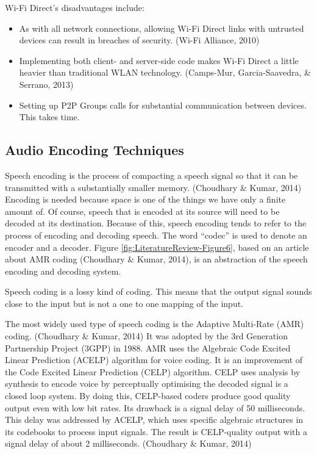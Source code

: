 \documentclass[12pt,svgnames,smaller]{article} %
\begin{document}
\begin{enumerate}
		Wi-Fi Direct’s disadvantages include:
		
		\begin{itemize}
			\item As with all network connections, allowing Wi-Fi Direct links with untrusted devices can result in breaches of security. (Wi-Fi Alliance, 2010)
			\item Implementing both client- and server-side code makes Wi-Fi Direct a little heavier than traditional WLAN technology. (Camps-Mur, Garcia-Saavedra, \& Serrano, 2013)
			\item Setting up P2P Groups calls for substantial communication between devices. This takes time. 
		\end{itemize}
		
		
	\end{enumerate} %
	
	
	\subsection{Audio Encoding Techniques}
	
	Speech encoding is the process of compacting a speech signal so that it can be transmitted with a substantially smaller memory. (Choudhary \& Kumar, 2014) Encoding is needed because space is one of the things we have only a finite amount of. Of course, speech that is encoded at its source will need to be decoded at its destination. Because of this, speech encoding tends to refer to the process of encoding and decoding speech. The word “codec” is used to denote an encoder and a decoder. Figure \ref{fig:LiteratureReview-Figure6}, based on an article about AMR coding (Choudhary \& Kumar, 2014), is an abstraction of the speech encoding and decoding system.
	
	Speech coding is a lossy kind of coding. This means that the output signal sounds close to the input but is not a one to one mapping of the input. 
	
	The most widely used type of speech coding is the Adaptive Multi-Rate (AMR) coding. (Choudhary \& Kumar, 2014) It was adopted by the 3rd Generation Partnership Project (3GPP) in 1988. AMR uses the Algebraic Code Excited Linear Prediction (ACELP) algorithm for voice coding. It is an improvement of the Code Excited Linear Prediction (CELP) algorithm. CELP uses analysis by synthesis to encode voice by perceptually optimising the decoded signal is a closed loop system. By doing this, CELP-based coders produce good quality output even with low bit rates. Its drawback is a signal delay of 50 milliseconds. This delay was addressed by ACELP, which uses specific algebraic structures in its codebooks to process input signals. The result is CELP-quality output with a signal delay of about 2 milliseconds. (Choudhary \& Kumar, 2014)
	
\end{document}

